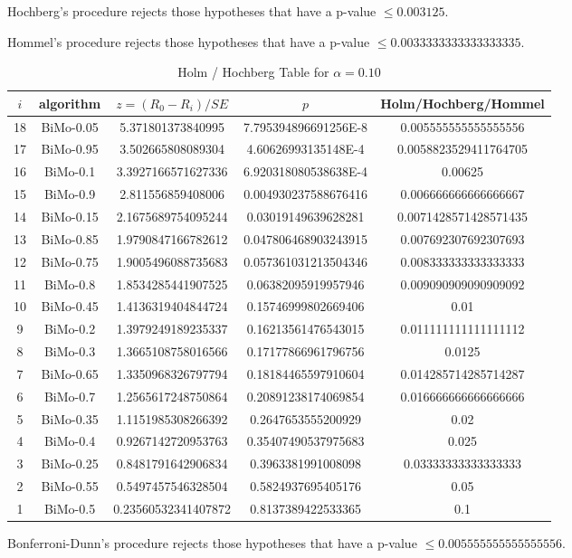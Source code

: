 \documentclass[a4paper,10pt]{article}
\begin{document}
\begin{landscape}
Hochberg's procedure rejects those hypotheses that have a p-value $\le0.003125$.


Hommel's procedure rejects those hypotheses that have a p-value $\le0.0033333333333333335$.


\begin{table}[!htp]
\centering\tiny
\caption{Holm / Hochberg Table for $\alpha=0.10$}
\begin{tabular}{ccccc}
$i$&algorithm&$z=(R_0 - R_i)/SE$&$p$&Holm/Hochberg/Hommel\\
\hline
18&BiMo-0.05&5.371801373840995&7.795394896691256E-8&0.005555555555555556\\
17&BiMo-0.95&3.502665808089304&4.60626993135148E-4&0.0058823529411764705\\
16&BiMo-0.1&3.3927166571627336&6.920318080538638E-4&0.00625\\
15&BiMo-0.9&2.811556859408006&0.004930237588676416&0.006666666666666667\\
14&BiMo-0.15&2.1675689754095244&0.03019149639628281&0.0071428571428571435\\
13&BiMo-0.85&1.9790847166782612&0.047806468903243915&0.007692307692307693\\
12&BiMo-0.75&1.9005496088735683&0.057361031213504346&0.008333333333333333\\
11&BiMo-0.8&1.8534285441907525&0.06382095919957946&0.009090909090909092\\
10&BiMo-0.45&1.4136319404844724&0.15746999802669406&0.01\\
9&BiMo-0.2&1.3979249189235337&0.16213561476543015&0.011111111111111112\\
8&BiMo-0.3&1.3665108758016566&0.17177866961796756&0.0125\\
7&BiMo-0.65&1.3350968326797794&0.18184465597910604&0.014285714285714287\\
6&BiMo-0.7&1.2565617248750864&0.20891238174069854&0.016666666666666666\\
5&BiMo-0.35&1.1151985308266392&0.2647653555200929&0.02\\
4&BiMo-0.4&0.9267142720953763&0.35407490537975683&0.025\\
3&BiMo-0.25&0.8481791642906834&0.3963381991008098&0.03333333333333333\\
2&BiMo-0.55&0.5497457546328504&0.5824937695405176&0.05\\
1&BiMo-0.5&0.23560532341407872&0.8137389422533365&0.1\\
\hline
\end{tabular}
\end{table}
Bonferroni-Dunn's procedure rejects those hypotheses that have a p-value $\le0.005555555555555556$.



\end{landscape}
\end{document}
